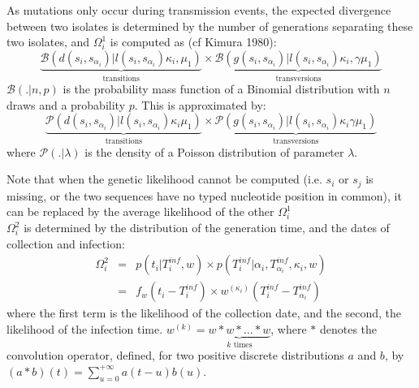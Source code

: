 \documentclass[10pt]{article}
\begin{document}
As mutations only occur during transmission events, the expected divergence between two isolates is determined by the number of generations separating these two isolates, and $\Omega_i^1$ is computed as (cf Kimura 1980): 
\begin{equation}
\underbrace{\mathcal{B}\left(d(s_i,s_{\alpha_i}) | l(s_i,s_{\alpha_i}) \kappa_i, \mu_1 \right)}_{\mbox{transitions}}
\times 
\underbrace{\mathcal{B}\left(g(s_i,s_{\alpha_i}) | l(s_i,s_{\alpha_i}) \kappa_i, \gamma \mu_1 \right)}_{\mbox{transversions}}
\end{equation}
% 
$\mathcal{B}(. | n, p)$ is the probability mass function of a Binomial distribution with $n$ draws and a probability $p$.
This is approximated by:
\begin{equation}
 \underbrace{\mathcal{P}\left(d(s_i,s_{\alpha_i}) | l(s_i,s_{\alpha_i}) \kappa_i \mu_1 \right)}_{\mbox{transitions}}
 \times 
 \underbrace{\mathcal{P}\left(g(s_i,s_{\alpha_i}) | l(s_i,s_{\alpha_i}) \kappa_i \gamma \mu_1 \right)}_{\mbox{transversions}}
 \end{equation}
where $\mathcal{P}(. | \lambda)$ is the density of a Poisson distribution of parameter $\lambda$.
 
 Note that when the genetic likelihood cannot be computed (i.e. $s_i$ or $s_j$ is missing, or the two sequences have no typed nucleotide position in common), it can be replaced by the average likelihood of the other $\Omega_i^{1}$
~\\





$\Omega_i^2$ is determined by the distribution of the generation time, and the dates of collection and infection:
\begin{eqnarray}
 \Omega_i^2 & = & p(t_i | T_i^{inf}, w) \times p(T_i^{inf}| \alpha_i, T_{\alpha_i}^{inf}, \kappa_i, w) \nonumber \\
& = &  f_w(t_i - T_i^{inf}) \times  w^{\left(\kappa_i\right)}(T_i^{inf} - T_{\alpha_i}^{inf})
\end{eqnarray}
where the first term is the likelihood of the collection date, and the second, the likelihood of the infection time.
$w^{\left(k\right)} = \underbrace{w*w*\ldots*w}_{k \text{ times}} $, where $*$ denotes the convolution operator, defined, for two positive discrete distributions $a$ and $b$, by $\left(a*b\right)\left(t\right) = \sum_{u=0}^{+\infty} a\left(t-u\right)b\left(u\right)$. 
\\
\end{document}
